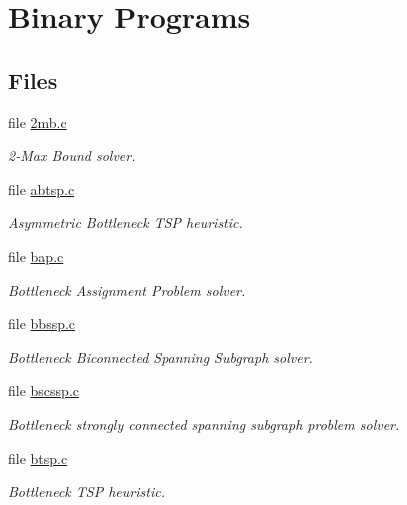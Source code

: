 \hypertarget{group__bin}{
\section{Binary Programs}
\label{group__bin}
}
\subsection*{Files}
\begin{CompactItemize}
\item 
file \hyperlink{bin_22mb_8c}{2mb.c}
\begin{CompactList}\small\item\em 2-Max Bound solver. \item\end{CompactList}

\item 
file \hyperlink{abtsp_8c}{abtsp.c}
\begin{CompactList}\small\item\em Asymmetric Bottleneck TSP heuristic. \item\end{CompactList}

\item 
file \hyperlink{bin_2bap_8c}{bap.c}
\begin{CompactList}\small\item\em Bottleneck Assignment Problem solver. \item\end{CompactList}

\item 
file \hyperlink{bin_2bbssp_8c}{bbssp.c}
\begin{CompactList}\small\item\em Bottleneck Biconnected Spanning Subgraph solver. \item\end{CompactList}

\item 
file \hyperlink{bin_2bscssp_8c}{bscssp.c}
\begin{CompactList}\small\item\em Bottleneck strongly connected spanning subgraph problem solver. \item\end{CompactList}

\item 
file \hyperlink{bin_2btsp_8c}{btsp.c}
\begin{CompactList}\small\item\em Bottleneck TSP heuristic. \item\end{CompactList}


\end{CompactItemize}
